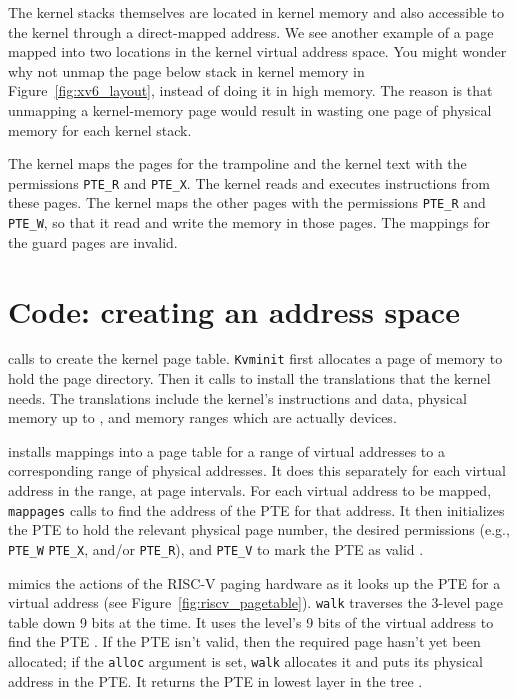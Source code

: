 The kernel stacks themselves are located in kernel memory and also
accessible to the kernel through a direct-mapped address.  We see
another example of a page mapped into two locations in the kernel
virtual address space.  You might wonder why not unmap the page below
stack in kernel memory in Figure~\ref{fig:xv6_layout}, instead of
doing it in high memory. The reason is that unmapping a kernel-memory
page would result in wasting one page of physical memory for each
kernel stack.

The kernel maps the pages for the trampoline and the kernel text with
the permissions
\lstinline{PTE_R}
and
\lstinline{PTE_X}.
The kernel reads and executes instructions from these pages.
The kernel maps the other pages with the permissions
\lstinline{PTE_R}
and
\lstinline{PTE_W},
so that it read and write the memory in those pages.
The mappings for the guard pages are invalid.


\section{Code: creating an address space}

calls
to create the kernel page table.
\lstinline{Kvminit}
first allocates a page of memory to hold the page directory.
Then it calls
to install the translations that the kernel needs.
The translations include the kernel's
instructions and data, physical memory up to
,
and memory ranges which are actually devices.

installs mappings into a page table
for a range of virtual addresses to
a corresponding range of physical addresses.
It does this separately for each virtual address in the range,
at page intervals.
For each virtual address to be mapped,
\lstinline{mappages}
calls
to find the address of the PTE for that address.
It then initializes the PTE to hold the relevant physical page
number, the desired permissions (e.g.,
\lstinline{PTE_W}
\lstinline{PTE_X},
and/or
\lstinline{PTE_R}),
and
\lstinline{PTE_V}
to mark the PTE as valid
.

mimics the actions of the RISC-V paging hardware as it
looks up the PTE for a virtual address (see
Figure~\ref{fig:riscv_pagetable}).
\lstinline{walk}
traverses the 3-level page table down 9 bits at the time.
It uses the level's 9 bits of the virtual address to find
the PTE
.
If the PTE isn't valid, then
the required page hasn't yet been allocated;
if the
\lstinline{alloc}
argument is set,
\lstinline{walk}
allocates it and puts its physical address in the PTE.
It returns the PTE in lowest layer in the tree
.

